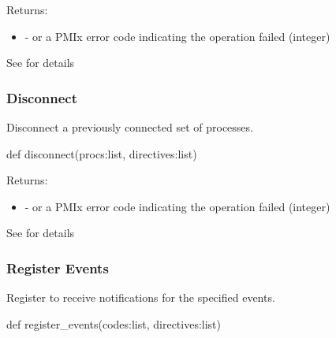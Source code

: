 Returns:
\begin{itemize}
    \item {} -  or a \ac{PMIx} error code indicating the operation failed (integer)
\end{itemize}

See  for details


\subsubsection{Disconnect}

\summary

Disconnect a previously connected set of processes.

\format

\pyspecificstart
\begin{codepar}
def disconnect(procs:list, directives:list)
\end{codepar}
\pyspecificend

\begin{arglist}
\end{arglist}

Returns:
\begin{itemize}
    \item {} -  or a \ac{PMIx} error code indicating the operation failed (integer)
\end{itemize}

See  for details


\subsubsection{Register Events}

\summary

Register to receive notifications for the specified events.

\format

\pyspecificstart
\begin{codepar}
def register_events(codes:list, directives:list)
\end{codepar}
\pyspecificend

\begin{arglist}
\end{arglist}

